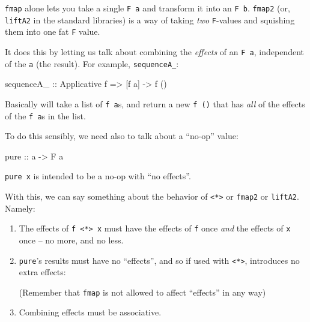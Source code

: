 \documentclass[]{article}
\newenvironment{Shaded}{}{}
\newcommand{\DataTypeTok}[1]{\textcolor[rgb]{0.56,0.13,0.00}{#1}}
\newcommand{\FunctionTok}[1]{\textcolor[rgb]{0.02,0.16,0.49}{#1}}
\newcommand{\NormalTok}[1]{#1}
\newcommand{\OperatorTok}[1]{\textcolor[rgb]{0.40,0.40,0.40}{#1}}
\newcommand{\OtherTok}[1]{\textcolor[rgb]{0.00,0.44,0.13}{#1}}
\begin{document}
\texttt{fmap} alone lets you take a single \texttt{F\ a} and transform it into
an \texttt{F\ b}. \texttt{fmap2} (or, \texttt{liftA2} in the standard libraries)
is a way of taking \emph{two} \texttt{F}-values and squishing them into one fat
\texttt{F} value.

It does this by letting us talk about combining the \emph{effects} of an
\texttt{F\ a}, independent of the \texttt{a} (the result). For example,
\texttt{sequenceA\_}:

\begin{Shaded}
\begin{Highlighting}[]
\OtherTok{sequenceA\_ ::} \DataTypeTok{Applicative}\NormalTok{ f }\OtherTok{=>}\NormalTok{ [f a] }\OtherTok{{-}>}\NormalTok{ f ()}
\end{Highlighting}
\end{Shaded}

Basically will take a list of \texttt{f\ a}s, and return a new \texttt{f\ ()}
that has \emph{all} of the effects of the \texttt{f\ a}s in the list.

To do this sensibly, we need also to talk about a ``no-op'' value:

\begin{Shaded}
\begin{Highlighting}[]
\FunctionTok{pure}\OtherTok{ ::}\NormalTok{ a }\OtherTok{{-}>} \DataTypeTok{F}\NormalTok{ a}
\end{Highlighting}
\end{Shaded}

\texttt{pure\ x} is intended to be a no-op with ``no effects''.

With this, we can say something about the behavior of
\texttt{\textless{}*\textgreater{}} or \texttt{fmap2} or \texttt{liftA2}.
Namely:

\begin{enumerate}
\def\labelenumi{\arabic{enumi}.}
\item
  The effects of \texttt{f\ \textless{}*\textgreater{}\ x} must have the effects
  of \texttt{f} once \emph{and} the effects of \texttt{x} once -- no more, and
  no less.
\item
  \texttt{pure}'s results must have no ``effects'', and so if used with
  \texttt{\textless{}*\textgreater{}}, introduces no extra effects:

\begin{Shaded}
\end{Shaded}

  (Remember that \texttt{fmap} is not allowed to affect ``effects'' in any way)
\item
  Combining effects must be associative.
\end{enumerate}
\end{document}
